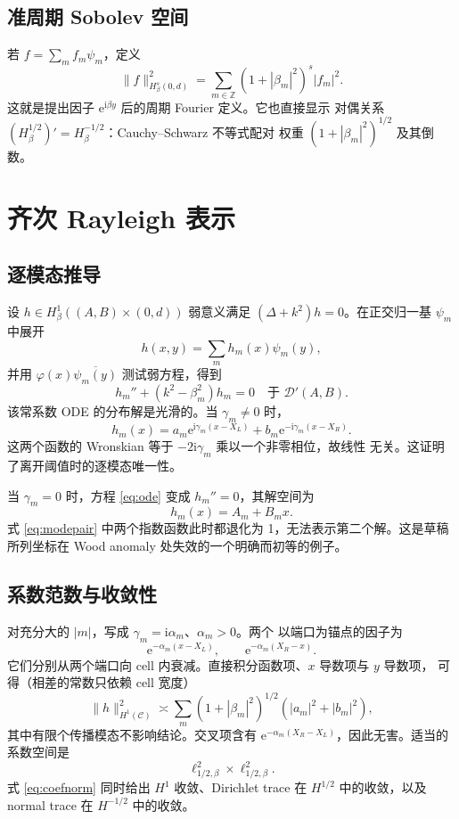 \documentclass[UTF8,11pt,fontset=fandol]{ctexart}
\newcommand{\C}{\mathcal C}
\newcommand{\Z}{\mathbb Z}
\newcommand{\ii}{\mathrm i}
\newcommand{\ee}{\mathrm e}
\theoremstyle{plain}
\theoremstyle{definition}
\theoremstyle{remark}
\begin{document}
\subsection{准周期 Sobolev 空间}

若 \(f=\sum_m f_m\psi_m\)，定义
\begin{equation}
\|f\|_{H^s_\beta(0,d)}^2
=\sum_{m\in\Z}(1+|\beta_m|^2)^s|f_m|^2.
\label{eq:Hs}
\end{equation}
这就是提出因子 \(\ee^{\ii\beta y}\) 后的周期 Fourier 定义。它也直接显示
对偶关系 \((H^{1/2}_\beta)'=H^{-1/2}_\beta\)：Cauchy--Schwarz 不等式配对
权重 \((1+|\beta_m|^2)^{1/2}\) 及其倒数。

\section{齐次 Rayleigh 表示}
\label{sec:rayleigh}

\subsection{逐模态推导}

设 \(h\in H^1_\beta((A,B)\times(0,d))\) 弱意义满足
\((\Delta+k^2)h=0\)。在正交归一基 \(\psi_m\) 中展开
\[
h(x,y)=\sum_m h_m(x)\psi_m(y),
\]
并用 \(\varphi(x)\overline{\psi_m(y)}\) 测试弱方程，得到
\begin{equation}
h_m''+(k^2-\beta_m^2)h_m=0
\quad\text{于 }\mathcal D'(A,B).
\label{eq:ode}
\end{equation}
该常系数 ODE 的分布解是光滑的。当 \(\gamma_m\neq0\) 时，
\begin{equation}
h_m(x)=a_m\ee^{\ii\gamma_m(x-X_L)}
+b_m\ee^{-\ii\gamma_m(x-X_R)}.
\label{eq:modepair}
\end{equation}
这两个函数的 Wronskian 等于 \(-2\ii\gamma_m\) 乘以一个非零相位，故线性
无关。这证明了离开阈值时的逐模态唯一性。

当 \(\gamma_m=0\) 时，方程 \eqref{eq:ode} 变成 \(h_m''=0\)，其解空间为
\begin{equation}
h_m(x)=A_m+B_mx.
\label{eq:threshold}
\end{equation}
式 \eqref{eq:modepair} 中两个指数函数此时都退化为 1，无法表示第二个解。这是草稿
所列坐标在 Wood anomaly 处失效的一个明确而初等的例子。

\subsection{系数范数与收敛性}

对充分大的 \(|m|\)，写成 \(\gamma_m=\ii\alpha_m\)、\(\alpha_m>0\)。两个
以端口为锚点的因子为
\[
\ee^{-\alpha_m(x-X_L)},\qquad
\ee^{-\alpha_m(X_R-x)}.
\]
它们分别从两个端口向 cell 内衰减。直接积分函数项、\(x\) 导数项与 \(y\) 导数项，
可得（相差的常数只依赖 cell 宽度）
\begin{equation}
\|h\|_{H^1(\C)}^2\asymp
\sum_m(1+|\beta_m|^2)^{1/2}(|a_m|^2+|b_m|^2),
\label{eq:coefnorm}
\end{equation}
其中有限个传播模态不影响结论。交叉项含有
\(\ee^{-\alpha_m(X_R-X_L)}\)，因此无害。适当的系数空间是
\[
\ell^2_{1/2,\beta}\times\ell^2_{1/2,\beta}.
\]
式 \eqref{eq:coefnorm} 同时给出 \(H^1\) 收敛、Dirichlet trace 在
\(H^{1/2}\) 中的收敛，以及 normal trace 在 \(H^{-1/2}\) 中的收敛。
\end{document}
